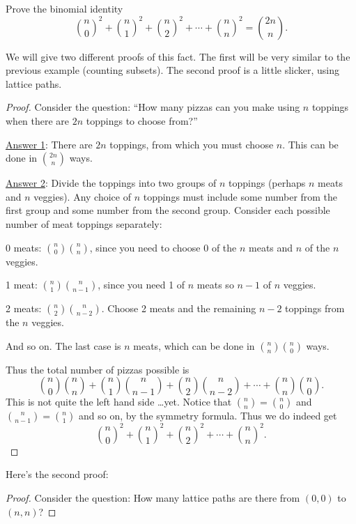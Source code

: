 \documentclass[12pt]{article}
\begin{document}
\begin{example}
  Prove the binomial identity
  \[{n \choose 0}^2 + {n \choose 1}^2 + {n \choose 2}^2 + \cdots + {n \choose n}^2 = {2n \choose n}.\]
  \begin{solution}
    We will give two different proofs of this fact.  The first will be very similar to the previous example (counting subsets).  The second proof is a little slicker, using lattice paths.
    
    \begin{proof}
      Consider the question: ``How many pizzas can you make using $n$ toppings when there are $2n$ toppings to choose from?''
      
      \underline{Answer 1}:  There are $2n$ toppings, from which you must choose $n$.  This can be done in ${2n \choose n}$ ways.
      
      \underline{Answer 2}: Divide the toppings into two groups of $n$ toppings (perhaps $n$ meats and $n$ veggies).  Any choice of $n$ toppings must include some number from the first group and some number from the second group.  Consider each possible number of meat toppings separately:
      
      0 meats: ${n \choose 0}{n \choose n}$, since you need to choose 0 of the $n$ meats and $n$ of the $n$ veggies.
      
      1 meat: ${n \choose 1}{n \choose n-1}$, since you need 1 of $n$ meats so $n-1$ of $n$ veggies.
      
      2 meats: ${n \choose 2}{n \choose n-2}$.  Choose 2 meats and the remaining $n-2$ toppings from the $n$ veggies.
      
      And so on.  The last case is $n$ meats, which can be done in ${n \choose n}{n \choose 0}$ ways.
      
      Thus the total number of pizzas possible is
      \[{n \choose 0}{n \choose n} + {n \choose 1}{n \choose n-1} + {n \choose 2}{n \choose n-2} + \cdots + {n \choose n}{n \choose 0}.\]
      This is not quite the left hand side \ldots yet.  Notice that ${n \choose n} = {n \choose 0}$ and ${n \choose n-1} = {n  \choose 1}$ and so on, by the symmetry formula.  Thus we do indeed get
      \[{n \choose 0}^2 + {n \choose 1}^2 + {n \choose 2}^2 + \cdots + {n \choose n}^2.\]      
    \end{proof}
    
    Here's the second proof:
    
    \begin{proof}
      Consider the question: How many lattice paths are there from $(0,0)$ to $(n,n)$?
      

\end{proof}
\end{solution}
\end{example}
\end{document}
